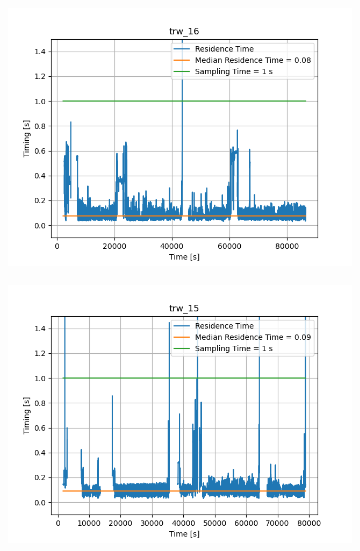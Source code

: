 \begin{figure}[H]
\begin{minipage}{0.49\textwidth}
    \end{minipage}
    \begin{minipage}{0.49\textwidth}
        \begin{figure}[H]
            \includegraphics[width=\textwidth]{figs/res_time/trw_16_timing_stuff.png}
        \end{figure}
    \end{minipage}
    \begin{minipage}{0.49\textwidth}
        \begin{figure}[H]
            \includegraphics[width=\textwidth]{figs/res_time/trw_15_timing_stuff.png}
        \end{figure}
    \end{minipage}
\end{figure}
